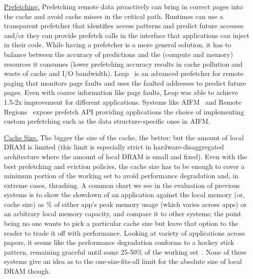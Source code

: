 \vspace{3pt}
\noindent \uline{Prefetching.}
Prefetching remote data proactively can bring in 
correct pages into the cache and avoid cache misses 
in the critical path. Runtimes can use a transparent 
prefetcher that identifies access patterns and predict 
future accesses and/or they can provide prefetch calls 
in the interface that applications can inject in their 
code. While having a prefetcher is a more general 
solution, it has to balance between the accuracy of 
predictions and the (compute and memory) resources
it consumes (lower prefetching accuracy results in 
cache pollution and waste of cache and I/O bandwidth).
Leap~\cite{leap} is an advanced prefetcher for remote 
paging that monitors page faults and uses the faulted 
addresses to predict future pages. Even with coarse 
information like page faults, Leap was able to achieve 
1.5-2x improvement for different applications. 
Systems like AIFM~\cite{aifm} and Remote 
Regions~\cite{remregions} expose prefetch API 
providing applications the choice of implementing custom
prefetching such as the data structure-specific ones in AIFM. 

\vspace{5pt}
\noindent \uline{Cache Size.}
The bigger the size of the cache, the better; but the 
amount of local DRAM is limited (this limit is 
especially strict in hardware-disaggregated architecture 
where the amount of local DRAM is small and fixed). 
Even with the best prefetching and eviction policies, 
the cache size has to be enough to cover a minimum portion 
of the working set to avoid performance degradation and, 
in extreme cases, thrashing. A common chart we see in the 
evaluation of previous systems is to show the slowdown of 
an application against the local memory (or, cache size) as 
\% of either app's peak memory usage (which varies across 
apps) or an arbitrary local memory capacity, and compare 
it to other systems; the point being no one wants to pick 
a particular cache size but leave that option to the reader 
to trade it off with performance. Looking at variety of 
applications across papers, it seems like the performance 
degradation conforms to a hockey stick pattern, remaining 
graceful until some 25-50\% of the working 
set~\cite{netdisagg,kona,legoos}. None of these systems give 
an idea as to the one-size-fits-all limit for the absolute 
size of local DRAM though.  

